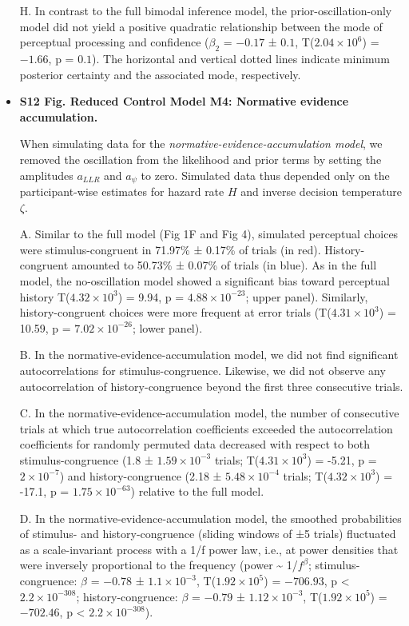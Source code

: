 \documentclass[
]{article}
\begin{document}
\begin{itemize}
H. In contrast to the full bimodal inference model, the
prior-oscillation-only model did not yield a positive quadratic
relationship between the mode of perceptual processing and confidence
(\(\beta_2\) = \(-0.17\) ± \(0.1\),
T(\(\ensuremath{2.04\times 10^{6}}\)) = \(-1.66\), p = \(0.1\)). The
horizontal and vertical dotted lines indicate minimum posterior
certainty and the associated mode, respectively.

\item \textbf{S12 Fig. Reduced Control Model M4: Normative evidence accumulation.}

When simulating data for the
\emph{normative-evidence-accumulation model}, we removed the oscillation
from the likelihood and prior terms by setting the amplitudes
\(a_{LLR}\) and \(a_{\psi}\) to zero. Simulated data thus depended only
on the participant-wise estimates for hazard rate \(H\) and inverse
decision temperature \(\zeta\).

A. Similar to the full model (Fig 1F and Fig 4), simulated
perceptual choices were stimulus-congruent in 71.97\% ± 0.17\% of trials
(in red). History-congruent amounted to 50.73\% ± 0.07\% of trials (in
blue). As in the full model, the no-oscillation model showed a
significant bias toward perceptual history
T(\ensuremath{4.32\times 10^{3}}) = 9.94, p =
\(\ensuremath{4.88\times 10^{-23}}\); upper panel). Similarly,
history-congruent choices were more frequent at error trials
(T(\ensuremath{4.31\times 10^{3}}) = 10.59, p =
\(\ensuremath{7.02\times 10^{-26}}\); lower panel).

B. In the normative-evidence-accumulation model, we did not find
significant autocorrelations for stimulus-congruence. Likewise, we did
not observe any autocorrelation of history-congruence beyond the first
three consecutive trials.

C. In the normative-evidence-accumulation model, the number of
consecutive trials at which true autocorrelation coefficients exceeded
the autocorrelation coefficients for randomly permuted data decreased
with respect to both stimulus-congruence (1.8 ±
\ensuremath{1.59\times 10^{-3}} trials;
T(\ensuremath{4.31\times 10^{3}}) = -5.21, p =
\(\ensuremath{2\times 10^{-7}}\)) and history-congruence (2.18 ±
\ensuremath{5.48\times 10^{-4}} trials;
T(\ensuremath{4.32\times 10^{3}}) = -17.1, p =
\(\ensuremath{1.75\times 10^{-63}}\)) relative to the full model.

D. In the normative-evidence-accumulation model, the smoothed
probabilities of stimulus- and history-congruence (sliding windows of ±5
trials) fluctuated as a scale-invariant process with a 1/f power law,
i.e., at power densities that were inversely proportional to the
frequency (power \textasciitilde{} 1/\(f^\beta\); stimulus-congruence:
\(\beta\) = \(-0.78\) ± \(\ensuremath{1.1\times 10^{-3}}\),
T(\(\ensuremath{1.92\times 10^{5}}\)) = \(-706.93\), p < \(\ensuremath{2.2\times 10^{-308}}\);
history-congruence: \(\beta\) = \(-0.79\) ±
\(\ensuremath{1.12\times 10^{-3}}\),
T(\(\ensuremath{1.92\times 10^{5}}\)) = \(-702.46\), p < \(\ensuremath{2.2\times 10^{-308}}\)).


\end{itemize}
\end{document}
